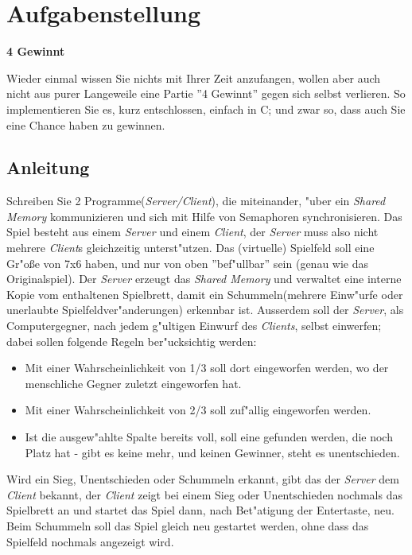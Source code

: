 




\section*{Aufgabenstellung}
\textbf{4 Gewinnt}

Wieder einmal wissen Sie nichts mit Ihrer Zeit anzufangen, wollen aber auch nicht aus purer Langeweile eine Partie ''4 Gewinnt'' gegen sich selbst verlieren. So implementieren Sie es, kurz entschlossen, einfach in C; und zwar so, dass auch Sie eine Chance haben zu gewinnen.

\subsection*{Anleitung}
Schreiben Sie 2 Programme(\emph{Server/Client}), die miteinander, "uber ein \emph{Shared Memory} kommunizieren und sich mit Hilfe von Semaphoren synchronisieren. Das Spiel besteht aus einem \emph{Server} und einem \emph{Client}, der \emph{Server} muss also nicht mehrere \emph{Client}s gleichzeitig unterst"utzen. Das (virtuelle) Spielfeld soll eine Gr"o{\ss}e von 7x6 haben, und nur von oben ''bef"ullbar'' sein (genau wie das Originalspiel). Der \emph{Server} erzeugt das \emph{Shared Memory} und verwaltet eine interne Kopie vom enthaltenen Spielbrett, damit ein Schummeln(mehrere Einw"urfe oder unerlaubte Spielfeldver"anderungen) erkennbar ist. Ausserdem soll der \emph{Server}, als Computergegner, nach jedem g"ultigen Einwurf des \emph{Clients}, selbst einwerfen; dabei sollen folgende Regeln ber"ucksichtig werden:
\begin{itemize}
\item Mit einer Wahrscheinlichkeit von 1/3 soll dort eingeworfen werden, wo der menschliche Gegner zuletzt eingeworfen hat.
\item Mit einer Wahrscheinlichkeit von 2/3 soll zuf"allig eingeworfen werden.
\item Ist die ausgew"ahlte Spalte bereits voll, soll eine gefunden werden, die noch Platz hat - gibt es keine mehr, und keinen Gewinner, steht es unentschieden.
\end{itemize}
Wird ein Sieg, Unentschieden oder Schummeln erkannt, gibt das der \emph{Server} dem \emph{Client} bekannt, der \emph{Client} zeigt bei einem Sieg oder Unentschieden nochmals das Spielbrett an und startet das Spiel dann, nach Bet"atigung der Entertaste, neu. Beim Schummeln soll das Spiel gleich neu gestartet werden, ohne dass das Spielfeld nochmals angezeigt wird.


